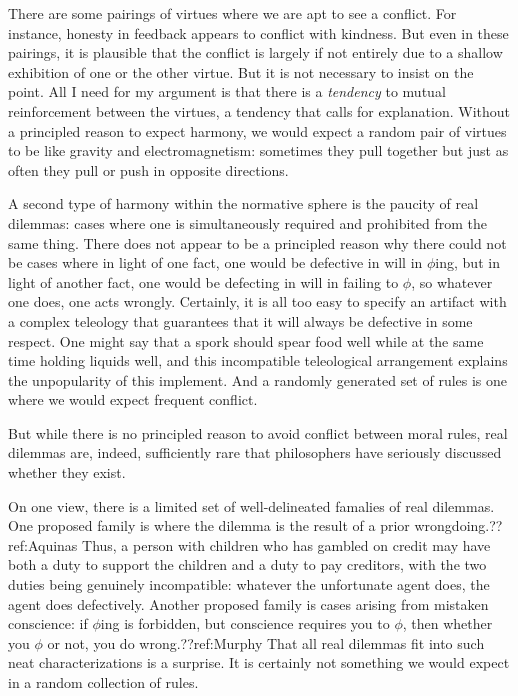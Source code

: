 There are some pairings of virtues where we are apt to see a conflict. For instance, honesty in feedback appears to 
conflict with kindness. But even in these pairings, it is plausible that the conflict is largely if not entirely
due to a shallow exhibition of one or the other virtue. But it is not necessary to insist on the point. All I need 
for my argument is that there is a \textit{tendency} to mutual reinforcement between the virtues, a tendency that 
calls for explanation. Without a principled reason to expect harmony, we would expect a random pair of virtues to be 
like gravity and electromagnetism: sometimes they pull together but just as often they pull or push in opposite 
directions.

A second type of harmony within the normative sphere is the paucity of real dilemmas: cases where one is simultaneously
required and prohibited from the same thing. There does not appear to be a principled reason why there could not be 
cases where in light of one fact, one would be defective in will in $\phi$ing, but in light of another fact, one 
would be defecting in will in failing to $\phi$, so whatever one does, one acts wrongly. Certainly, it is all too 
easy to specify an artifact with a complex teleology that guarantees that it will 
always be defective in some respect. One might say that a spork should spear food well while at the same time holding 
liquids well, and this incompatible teleological arrangement explains the unpopularity of this implement. And a randomly
generated set of rules is one where we would expect frequent conflict.

But while there is no principled reason to avoid conflict between moral rules, real dilemmas are, indeed, sufficiently
rare that philosophers have seriously discussed whether they exist. 

On one view, there is a limited set of well-delineated famalies of real dilemmas. One proposed family is where the 
dilemma is the result of a prior wrongdoing.??ref:Aquinas Thus, a person with children who has gambled on credit may have both a duty 
to support the children and a duty to pay creditors, with the two duties being genuinely incompatible: whatever the 
unfortunate agent does, the agent does defectively. Another proposed family is cases arising from mistaken conscience:
if $\phi$ing is forbidden, but conscience requires you to $\phi$, then whether you $\phi$ or not, you do wrong.??ref:Murphy 
That all real dilemmas fit into such neat characterizations is a surprise. It is certainly not something we would expect 
in a random collection of rules.

